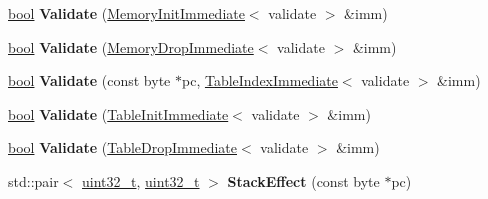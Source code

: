 \begin{DoxyCompactItemize}
\mbox{\hyperlink{classbool}{bool}} {\bfseries Validate} (\mbox{\hyperlink{structv8_1_1internal_1_1wasm_1_1MemoryInitImmediate}{Memory\+Init\+Immediate}}$<$ validate $>$ \&imm)
\item 
\mbox{\label{classv8_1_1internal_1_1wasm_1_1WasmDecoder_a6f09d7e3d0d7c0f02a8247f130305f21}} 
\mbox{\hyperlink{classbool}{bool}} {\bfseries Validate} (\mbox{\hyperlink{structv8_1_1internal_1_1wasm_1_1MemoryDropImmediate}{Memory\+Drop\+Immediate}}$<$ validate $>$ \&imm)
\item 
\mbox{\label{classv8_1_1internal_1_1wasm_1_1WasmDecoder_a805a1ed2fc2ecfb6392c5be0c6afa944}} 
\mbox{\hyperlink{classbool}{bool}} {\bfseries Validate} (const byte $\ast$pc, \mbox{\hyperlink{structv8_1_1internal_1_1wasm_1_1TableIndexImmediate}{Table\+Index\+Immediate}}$<$ validate $>$ \&imm)
\item 
\mbox{\label{classv8_1_1internal_1_1wasm_1_1WasmDecoder_a29182f63878f1ce9ea49c15af6b80f0f}} 
\mbox{\hyperlink{classbool}{bool}} {\bfseries Validate} (\mbox{\hyperlink{structv8_1_1internal_1_1wasm_1_1TableInitImmediate}{Table\+Init\+Immediate}}$<$ validate $>$ \&imm)
\item 
\mbox{\label{classv8_1_1internal_1_1wasm_1_1WasmDecoder_a5b11da87eca3014bb1f55c55ad554570}} 
\mbox{\hyperlink{classbool}{bool}} {\bfseries Validate} (\mbox{\hyperlink{structv8_1_1internal_1_1wasm_1_1TableDropImmediate}{Table\+Drop\+Immediate}}$<$ validate $>$ \&imm)
\item 
\mbox{\label{classv8_1_1internal_1_1wasm_1_1WasmDecoder_ac8173e32ad53a3c13b4164407081d3fd}} 
std\+::pair$<$ \mbox{\hyperlink{classuint32__t}{uint32\+\_\+t}}, \mbox{\hyperlink{classuint32__t}{uint32\+\_\+t}} $>$ {\bfseries Stack\+Effect} (const byte $\ast$pc)
\end{DoxyCompactItemize}
